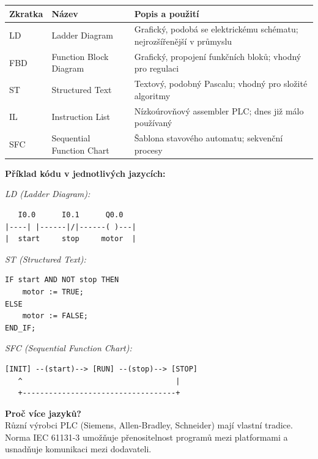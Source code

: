 \documentclass[a4paper,10pt]{article}
\begin{document}
\begin{vysvetlenibox}
\begin{center}
\begin{tabularx}{0.95\linewidth}{@{} l l X @{}}
    \toprule
    \textbf{Zkratka} & \textbf{Název} & \textbf{Popis a použití} \\
    \midrule
    LD  & Ladder Diagram & Grafický, podobá se elektrickému schématu;
                           nejrozšířenější v průmyslu \\
    FBD & Function Block Diagram & Grafický, propojení funkčních bloků;
                                   vhodný pro regulaci \\
    ST  & Structured Text & Textový, podobný Pascalu;
                            vhodný pro složité algoritmy \\
    IL  & Instruction List & Nízkoúrovňový assembler PLC;
                             dnes již málo používaný \\
    SFC & Sequential Function Chart & Šablona stavového automatu;
                                       sekvenční procesy \\
    \bottomrule
\end{tabularx}
\end{center}

\textbf{Příklad kódu v jednotlivých jazycích:}

\textit{LD (Ladder Diagram):}
\begin{verbatim}
   I0.0      I0.1      Q0.0
|----| |------|/|------( )---|
|  start     stop     motor  |
\end{verbatim}

\textit{ST (Structured Text):}
\begin{verbatim}
IF start AND NOT stop THEN
    motor := TRUE;
ELSE
    motor := FALSE;
END_IF;
\end{verbatim}

\textit{SFC (Sequential Function Chart):}
\begin{verbatim}
[INIT] --(start)--> [RUN] --(stop)--> [STOP]
   ^                                   |
   +-----------------------------------+
\end{verbatim}

\textbf{Proč více jazyků?}\\
Různí výrobci PLC (Siemens, Allen-Bradley, Schneider) mají vlastní tradice.
Norma IEC 61131-3 umožňuje přenositelnost programů mezi platformami a usnadňuje
komunikaci mezi dodavateli.
\end{vysvetlenibox}
\end{document}
